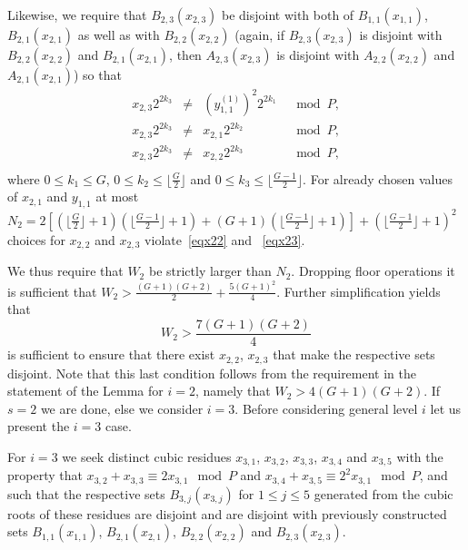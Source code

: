 Likewise, we require that $B_{2,3}(x_{2,3})$ be disjoint with both
 of  $B_{1,1}(x_{1,1})$, $B_{2,1}(x_{2,1})$ as well as with
$B_{2,2}(x_{2,2})$ (again, if $B_{2,3}(x_{2,3})$ is disjoint with
$B_{2,2}(x_{2,2})$ and $B_{2,1}(x_{2,1})$, then $A_{2,3}(x_{2,3})$
is disjoint with $A_{2,2}(x_{2,2})$ and $A_{2,1}(x_{2,1})$) so
that
\begin{equation}\label{eqx23}\begin{array}{cccc}
x_{2,3}2^{2k_3} &\neq& (y_{1,1}^{(1)})^2 2^{2k_1} &\mod P, \\
x_{2,3}2^{2k_3} &\neq& x_{2,1} 2^{2k_2} &\mod P, \\
x_{2,3}2^{2k_3} &\neq& x_{2,2} 2^{2k_3} &\mod P, \\
\end{array}\end{equation}
where $0 \leq k_1 \leq G$, $0 \leq k_2 \leq \lfloor \frac{G}{2}
\rfloor$ and $0 \leq k_3 \leq \lfloor\frac{G-1}{2} \rfloor$. For
already chosen values of $x_{2,1}$ and $y_{1,1}$ at most $N_2=
2\left[ \left(\lfloor \frac{G}{2} \rfloor +1 \right)\left(\lfloor
\frac{G-1}{2} \rfloor +1 \right)+ \left( G+1 \right)\left(\lfloor
\frac{G-1}{2} \rfloor +1 \right)\right]+\left( \lfloor
\frac{G-1}{2} \rfloor +1 \right)^2  $ choices for $x_{2,2}$ and
$x_{2,3}$ violate~\eqref{eqx22} and ~\eqref{eqx23}.

We thus require that $W_2$ be strictly larger than $N_2$. Dropping
floor operations it is sufficient that $W_2 > \frac{(G+1)(G+2)}{2}
+ \frac{5(G+1)^2}{4}$. Further  simplification yields that
\begin{equation}
W_2 > \frac{7(G+1)(G+2)}{4}
\end{equation}
is sufficient to ensure that there exist $x_{2,2}$, $x_{2,3}$ that
make the respective sets disjoint. Note that this last condition
follows from the requirement in the statement of the Lemma for
$i=2$, namely that $W_2 > 4(G+1)(G+2)$. If $s=2$ we are done, else
we consider $i=3$. Before considering general level $i$ let us
present the $i=3$ case.

For $i=3$ we seek distinct cubic residues $x_{3,1}$, $x_{3,2}$,
$x_{3,3}$, $x_{3,4}$ and $x_{3,5}$ with the property that
$x_{3,2}+ x_{3,3} \equiv 2x_{3,1} \mod P$ and $x_{3,4}+ x_{3,5}
\equiv 2^2x_{3,1} \mod P$, and such that the respective sets
$B_{3,j}(x_{3,j})$ for $1 \leq j \leq 5$ generated from the cubic
roots of these residues are disjoint and are disjoint with
previously constructed sets $B_{1,1}(x_{1,1})$,
$B_{2,1}(x_{2,1})$, $B_{2,2}(x_{2,2})$ and $B_{2,3}(x_{2,3})$.


